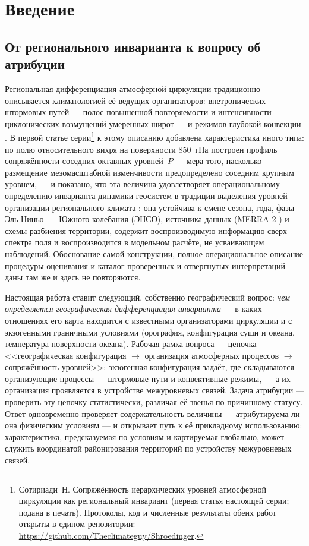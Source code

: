 \documentclass[11pt,a4paper]{article}
\begin{document}
\section{Введение}
\label{sec:intro}

\subsection{От регионального инварианта к вопросу об атрибуции}

Региональная дифференциация атмосферной циркуляции традиционно описывается климатологией её ведущих организаторов: внетропических штормовых путей --- полос повышенной повторяемости и интенсивности циклонических возмущений умеренных широт \cite{HoskinsValdes1990,Chang2002,HoskinsHodges2005,Shaw2016} --- и режимов глубокой конвекции \cite{Houze2004,Feng2021}. В первой статье серии\footnote{Сотириади~Н. Сопряжённость иерархических уровней атмосферной циркуляции как региональный инвариант (первая статья настоящей серии; подана в печать). Протоколы, код и численные результаты обеих работ открыты в едином репозитории: \url{https://github.com/Theclimateguy/Shroedinger}.} к этому описанию добавлена характеристика иного типа: по полю относительного вихря на поверхности 850~гПа построен профиль сопряжённости соседних октавных уровней~$P$ --- мера того, насколько размещение мезомасштабной изменчивости предопределено соседним крупным уровнем, --- и показано, что эта величина удовлетворяет операциональному определению инварианта динамики геосистем \cite{Puzachenko1986,Puzachenko2004,Puzachenko2010} в традиции выделения уровней организации регионального климата \cite{Krenke2019}: она устойчива к смене сезона, года, фазы Эль-Ниньо~--- Южного колебания (ЭНСО), источника данных (MERRA-2 \cite{Gelaro2017}) и схемы разбиения территории, содержит воспроизводимую информацию сверх спектра поля и воспроизводится в модельном расчёте, не усваивающем наблюдений. Обоснование самой конструкции, полное операциональное описание процедуры оценивания и каталог проверенных и отвергнутых интерпретаций даны там же и здесь не повторяются.

Настоящая работа ставит следующий, собственно географический вопрос: \emph{чем определяется географическая дифференциация инварианта} --- в каких отношениях его карта находится с известными организаторами циркуляции и с экзогенными граничными условиями (орография, конфигурация суши и океана, температура поверхности океана). Рабочая рамка вопроса --- цепочка <<географическая конфигурация $\to$ организация атмосферных процессов $\to$ сопряжённость уровней>>: экзогенная конфигурация задаёт, где складываются организующие процессы --- штормовые пути и конвективные режимы, --- а их организация проявляется в устройстве межуровневых связей. Задача атрибуции --- проверить эту цепочку статистически, различая её звенья по причинному статусу. Ответ одновременно проверяет содержательность величины --- атрибутируема ли она физическим условиям --- и открывает путь к её прикладному использованию: характеристика, предсказуемая по условиям и картируемая глобально, может служить координатой районирования территорий по устройству межуровневых связей.
\end{document}
